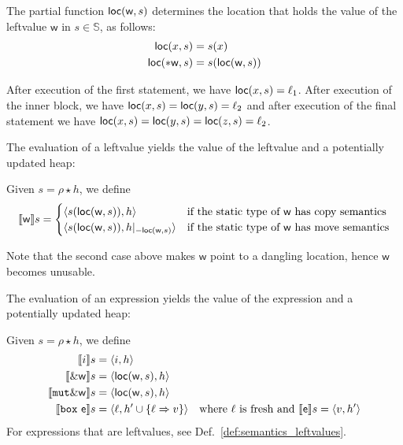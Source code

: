\begin{definition}[Locate]
  The partial function $\loc(\mathsf{w},s)$ determines the location that holds
  the value of the leftvalue $\mathsf{w}$ in $s\in\mathbb{S}$, as follows:
  \begin{align*}
    \loc(x,s) &= s(x)\\
    \loc(*\mathsf{w},s) &= s(\loc(\mathsf{w},s))
  \end{align*}
\end{definition}

\begin{example}
  After execution of the first statement, we have $\loc(x,s) = \ell_1$.
  After execution of the inner block, we have $\loc(x,s) = \loc(y,s) = \ell_2$
  and after execution of the final statement we have
  $\loc(x,s) = \loc(y,s) = \loc(z,s) = \ell_2$.
\end{example}


The evaluation of a leftvalue yields the value of the leftvalue and a potentially updated heap:

\begin{definition}\label{def:semantics_leftvalues}
  Given $s=\rho\star h$, we define
  \[
  \den[\mathsf{w}]{s}=\begin{cases}
  \langle s(\loc(\mathsf{w},s)), h\rangle & \text{if the static type of $\mathsf{w}$ has copy semantics}\\
  \langle s(\loc(\mathsf{w},s)), h|_{-\loc(\mathsf{w},s)}\rangle & \text{if the static type of $\mathsf{w}$ has move semantics}
  \end{cases}
  \]
\end{definition}

\noindent
Note that the second case above makes $\mathsf{w}$ point to a dangling location, hence
$\mathsf{w}$ becomes unusable.

The evaluation of an expression yields the value of the expression and a potentially updated heap:

\begin{definition}\label{def:semantics_expressions}
  Given $s=\rho\star h$, we define
  \begin{align*}
    \den[i]{s}&=\langle i,h\rangle\\
    \den[\borrow\mathsf{w}]{s}&=\langle\loc(\mathsf{w},s),h\rangle\\
    \den[\mathtt{mut}\borrow\mathsf{w}]{s}&=\langle\loc(\mathsf{w},s),h\rangle\\
    \den[\mathtt{box}\ \mathsf{e}]{s}&=\langle\ell,h'\cup\{\ell\Rightarrow v\}\rangle
    & \text{where $\ell$ is fresh and $\den[\mathsf{e}]{s}=\langle v, h'\rangle$}
  \end{align*}
  For expressions that are leftvalues, see Def.~\ref{def:semantics_leftvalues}.
\end{definition}

